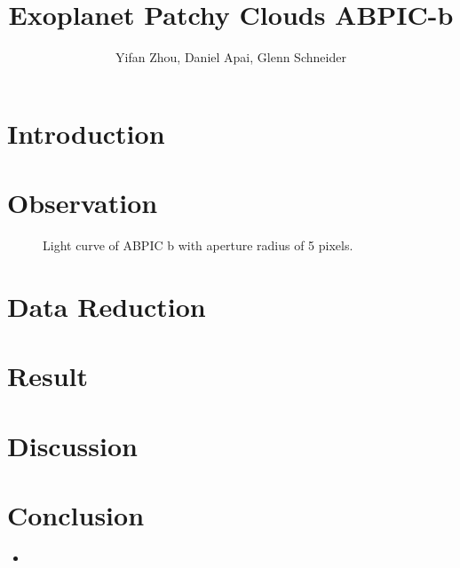 \documentclass{aastex}
\begin{document}
\title{Exoplanet Patchy Clouds ABPIC-b}
\author{Yifan Zhou, Daniel Apai, Glenn Schneider}
\section{Introduction}

\section{Observation}
\begin{figure}
  \centering
  \caption{Light curve of ABPIC b with aperture radius of 5 pixels.}
  \label{fig:lc}
\end{figure}
\section{Data Reduction}

\section{Result}

\section{Discussion}

\section{Conclusion}
\begin{itemize}
\item 
\end{itemize}
\end{document}
